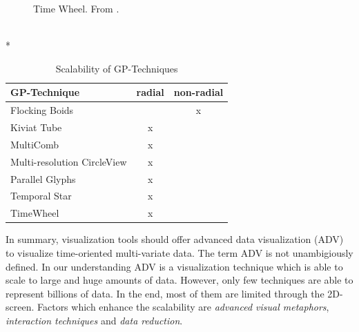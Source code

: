 \begin{figure}[H]
    \centering
    \caption{Time Wheel. From \cite{Aigner2011}.}
    \label{fig:timewheel}
\end{figure}
\\*

\begin{table}[H]
	\centering
	\caption[Table 1]{Scalability of GP-Techniques}
	\label{GPscalability}
	\begin{tabu}{lcc}
	\toprule
	GP-Technique & radial & non-radial \\
	\midrule
	Flocking Boids &  & x \\
	Kiviat Tube & x &  \\
	MultiComb & x &  \\
	Multi-resolution CircleView & x &  \\
	Parallel Glyphs & x &  \\
    Temporal Star & x &  \\
	TimeWheel & x & \\
	\bottomrule
	\end{tabu}
\end{table}


In summary, visualization tools should offer advanced data visualization (ADV) to visualize time-oriented multi-variate data. The term ADV is not unambigiously defined\cite{Aigner2011,Keim}. 
In our understanding ADV is a visualization technique which is able to scale to large and huge amounts of data.
However, only few techniques are able to represent billions of data. In the end, most of them are limited through the 2D-screen. Factors which enhance the scalability are \textit{advanced visual metaphors}, \textit{interaction techniques} and \textit{data reduction}. 



